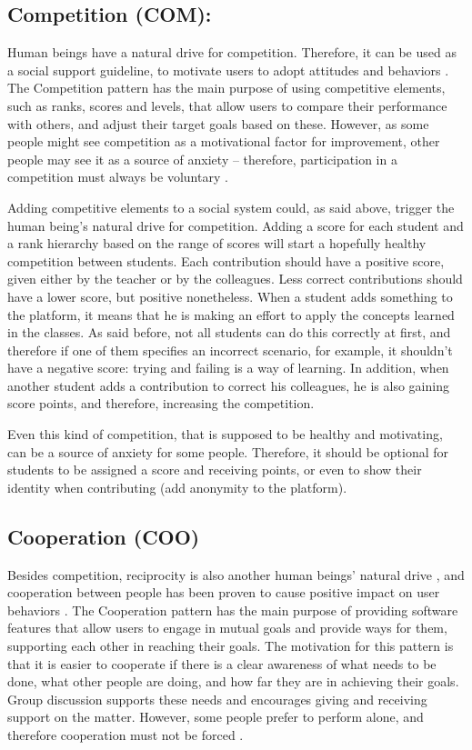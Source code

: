 \subsection{Competition (COM):}
Human beings have a natural drive for competition. Therefore, it can be used as a social support guideline, to motivate users to adopt attitudes and behaviors \cite{oinas2009persuasive}. The Competition pattern has the main purpose of using competitive elements, such as ranks, scores and levels, that allow users to compare their performance with others, and adjust their target goals based on these. However, as some people might see competition as a motivational factor for improvement, other people may see it as a source of anxiety – therefore, participation in a competition must always be voluntary \cite{oduor2014persuasive}.

Adding competitive elements to a social system could, as said above, trigger the human being's natural drive for competition. Adding a score for each student and a rank hierarchy based on the range of scores will start a hopefully healthy competition between students. Each contribution should have a positive score, given either by the teacher or by the colleagues. Less correct contributions should have a lower score, but positive nonetheless. When a student adds something to the platform, it means that he is making an effort to apply the concepts learned in the classes. As said before, not all students can do this correctly at first, and therefore if one of them specifies an incorrect scenario, for example, it shouldn't have a negative score: trying and failing is a way of learning. In addition, when another student adds a contribution to correct his colleagues, he is also gaining score points, and therefore, increasing the competition.

Even this kind of competition, that is supposed to be healthy and motivating, can be a source of anxiety for some people. Therefore, it should be optional for students to be assigned a score and receiving points, or even to show their identity when contributing (add anonymity to the platform). 

\subsection{Cooperation (COO)}
Besides competition, reciprocity is also another human beings' natural drive \cite{cialdini1993influence,malone1987making}, and cooperation between people has been proven to cause positive impact on user behaviors \cite{stibe2012exploring}. The Cooperation pattern has the main purpose of providing software features that allow users to engage in mutual goals and provide ways for them, supporting each other in reaching their goals. The motivation for this pattern is that it is easier to cooperate if there is a clear awareness of what needs to be done, what other people are doing, and how far they are in achieving their goals. Group discussion supports these needs and encourages giving and receiving support on the matter. However, some people prefer to perform alone, and therefore cooperation must not be forced \cite{oduor2014persuasive}. 

